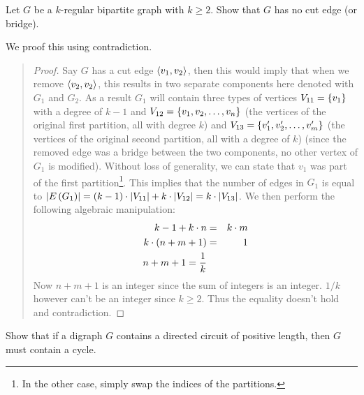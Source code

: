 \documentclass{article}
\begin{document}
\begin{exercise}
Let $G$ be a $k$-regular bipartite graph with $k\geq2$. Show that $G$ has no cut edge (or bridge).
\begin{answer}
We proof this using contradiction.
\begin{quote}\begin{proof}
Say $G$ has a cut edge $\left\langle v_1,v_2 \right\rangle$, then this would imply that when we remove $\left\langle v_2,v_2 \right\rangle$, this results in two separate components here denoted with $G_1$ and $G_2$. As a result $G_1$ will contain three types of vertices $V_{11}=\left\{ v_1 \right\}$ with a degree of $k-1$ and $V_{12}=\left\{ v_1,v_2,\ldots,v_n \right\}$ (the vertices of the original first partition, all with degree $k$) and $V_{13}=\left\{ v_1',v_2',\ldots,v_m' \right\}$ (the vertices of the original second partition, all with a degree of $k$) (since the removed edge was a bridge between the two components, no other vertex of $G_1$ is modified). Without loss of generality, we can state that $v_1$ was part of the first partition\footnote{In the other case, simply swap the indices of the partitions.}. This implies that the number of edges in $G_1$ is equal to $\left|E\left( G_1 \right)\right|=\left( k-1 \right)\cdot\left|V_{11}\right|+k\cdot\left|V_{12}\right|=k\cdot\left|V_{13}\right|$. We then perform the following algebraic manipulation:
\begin{eqnarray}
k-1+k\cdot n&=&k\cdot m\\
k\cdot\left( n+m+1 \right)&=&1\\
n+m+1=\displaystyle\frac{1}{k}
\end{eqnarray}
Now $n+m+1$ is an integer since the sum of integers is an integer. $1/k$ however can't be an integer since $k\geq2$. Thus the equality doesn't hold and contradiction.
\end{proof}\end{quote}
\end{answer}
\end{exercise}

\begin{exercise}
Show that if a digraph $G$ contains a directed circuit of positive length, then $G$ must contain a cycle.
\begin{answer}

\end{answer}
\end{exercise}
\end{document}
